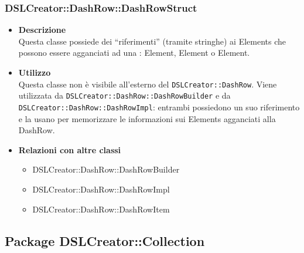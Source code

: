  \subsubsection{DSLCreator::DashRow::DashRowStruct}
                    \begin{itemize}
                        \item \textbf{Descrizione} \hfill \\
                            Questa classe possiede dei ``riferimenti'' (tramite stringhe) ai  Elements che possono essere agganciati ad una :  Element,  Element o  Element.
                        \item \textbf{Utilizzo} \hfill \\
                            Questa classe non è visibile all'esterno del  \texttt{DSLCreator::DashRow}. Viene utilizzata da \texttt{DSLCreator::DashRow::DashRowBuilder} e da \texttt{DSLCreator::Dash\-Row::DashRowImpl}: entrambi possiedono un suo riferimento e la usano per memorizzare le informazioni sui  Elements agganciati alla DashRow.
                        \item \textbf{Relazioni con altre classi}
                            \begin{itemize}
                              \item DSLCreator::DashRow::DashRowBuilder
                              \item DSLCreator::DashRow::DashRowImpl
                              \item DSLCreator::DashRow::DashRowItem
                            \end{itemize}
                    \end{itemize}

\subsection{Package DSLCreator::Collection}
